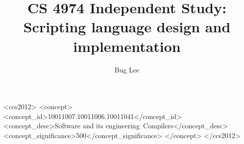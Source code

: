 \documentclass[manuscript,screen,nonacm]{acmart}
\begin{document}
\title{CS 4974 Independent Study: Scripting language design and implementation}

\author{Bug Lee}
\makeatletter
\let\@authorsaddresses\@empty
\makeatother

\renewcommand{\shortauthors}{Lee.}

\begin{abstract}

\end{abstract}

\begin{CCSXML}
<ccs2012>
   <concept>
       <concept_id>10011007.10011006.10011041</concept_id>
       <concept_desc>Software and its engineering~Compilers</concept_desc>
       <concept_significance>500</concept_significance>
       </concept>
 </ccs2012>
\end{CCSXML}




\maketitle
\end{document}
